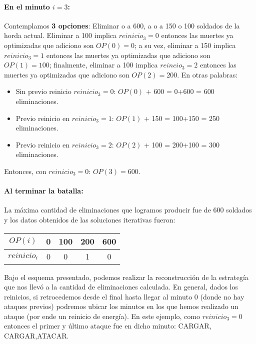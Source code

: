 \paragraph{En el minuto $i=3$:} Contemplamos \textbf{3 opciones}: Eliminar o a 600, a o a 150 o 100 soldados de la horda actual. Eliminar a 100 implica $reinicio_3=0$ entonces las muertes ya optimizadas que adiciono son $OP(0)=0$; a su vez, eliminar a 150 implica $reinicio_3=1$ entonces las muertes ya optimizadas que adiciono son $OP(1)=100$; finalmente, eliminar a 100 implica $reincio_3=2$ entonces las muertes ya optimizadas que adiciono son $OP(2)=200$. En otras palabras:

\begin{itemize}
    \item Sin previo reinicio $reinicio_3=0$: $OP(0)$ + 600 = 0+600 = 600 eliminaciones.
    \item Previo reinicio en $reinicio_3=1$: $OP(1)$ + 150 = 100+150 = 250 eliminaciones.
    \item Previo reinicio en $reinicio_3=2$: $OP(2)$ + 100 = 200+100 = 300 eliminaciones.
\end{itemize}
Entonces, con $reinicio_3=0$: $OP(3) = 600$. 

\paragraph{Al terminar la batalla:} La máxima cantidad de eliminaciones que logramos producir fue de 600 soldados y los datos obtenidos de las soluciones iterativas fueron:

\begin{center}
\begin{tabular}{ |c|c|c|c|c| }
\hline
\textbf{$OP(i)$} & 0 & 100 & 200 & 600 \\ \hline
\textbf{$reinicio_i$} & 0 & 0 & 1 & 0 \\
\hline
\end{tabular}
\end{center}

Bajo el esquema presentado, podemos realizar la reconstrucción de la estrategía que nos llevó a la cantidad de eliminaciones calculada. En general, dados los reinicios, si retrocedemos desde el final hasta llegar al minuto 0 (donde no hay ataques previos) podremos ubicar los minutos en los que hemos realizado un ataque (por ende un reinicio de energía). En este ejemplo, como $reinicio_3=0$ entonces el primer y último ataque fue en dicho minuto: CARGAR, CARGAR,ATACAR. 

